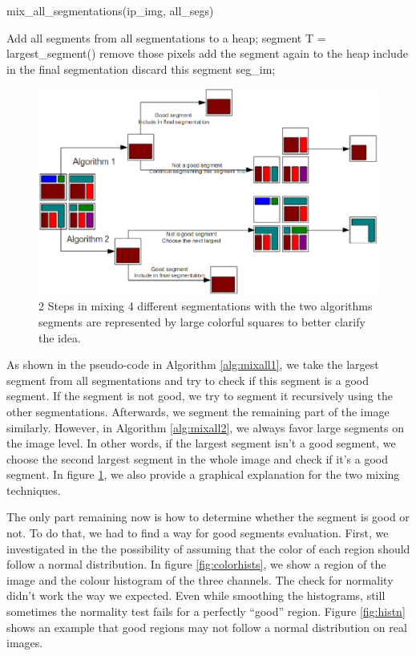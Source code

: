 \documentclass[twoside,11pt]{article}
\begin{document}
\begin{algorithm}
\caption{mix\_all\_segmentations(ip\_img, all\_segs)}
\label{alg:mixall2}
\begin{algorithmic}
\STATE Add all segments from all segmentations to a heap;
\STATE segment T = largest\_segment()
\STATE remove those pixels
\STATE add the segment again to the heap
\ELSE
{}
\STATE include in the final segmentation
\ELSE
\STATE discard this segment
\ENDIF
\ENDIF
\ENDWHILE
\RETURN seg\_im;
\end{algorithmic}
\end{algorithm}
\begin{figure}
\includegraphics[scale =.8]{./Figures/mixsegs.eps}
\centering
\caption{2 Steps in mixing 4 different segmentations with the two algorithms
segments are represented by large colorful squares to better clarify the idea.}
\label{fig:mixsegsalgo}
\end{figure}

As shown in the pseudo-code in Algorithm \ref{alg:mixall1}, we take the largest
segment from all segmentations and try to check if this segment is a good
segment. If the segment is not good, we try to segment it recursively using the
other segmentations. Afterwards, we segment the remaining part of the image
similarly. However, in Algorithm \ref{alg:mixall2},
we always favor large segments on the image level. In other words, if the
largest segment isn't a good segment,
we choose the second largest segment in the whole image and check if it's a good
segment. In figure \ref{fig:mixsegsalgo}, we also provide a graphical
explanation for the two mixing techniques.

The only part remaining now is how to determine whether the segment is good or
not. To do that, we had to find a way for good segments evaluation.
First, we investigated in the the possibility of assuming that the color of each
region should follow a
normal distribution. In figure \ref{fig:colorhists}, we show a region of the
image and the colour histogram
of the three channels. The check for normality didn't work the way we expected.
Even while smoothing
the histograms, still sometimes the normality test fails for a perfectly
``good'' region. Figure \ref{fig:histn} shows an example that good regions
may not follow a normal distribution on real images.
\end{document}

